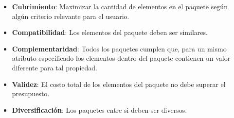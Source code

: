 \begin{itemize}
  \item \textbf{Cubrimiento}: Maximizar la cantidad de elementos en el paquete según algún criterio relevante para el usuario.
  \item \textbf{Compatibilidad}: Los elementos del paquete deben ser similares.
  \item \textbf{Complementaridad}: Todos los paquetes cumplen que, para un mismo atributo especificado los elementos dentro del paquete contienen un valor diferente para tal propiedad.
  \item \textbf{Validez}: El costo total de los elementos del paquete no debe superar el presupuesto.
  \item \textbf{Diversificación}: Los paquetes entre si deben ser diversos.
\end{itemize}
